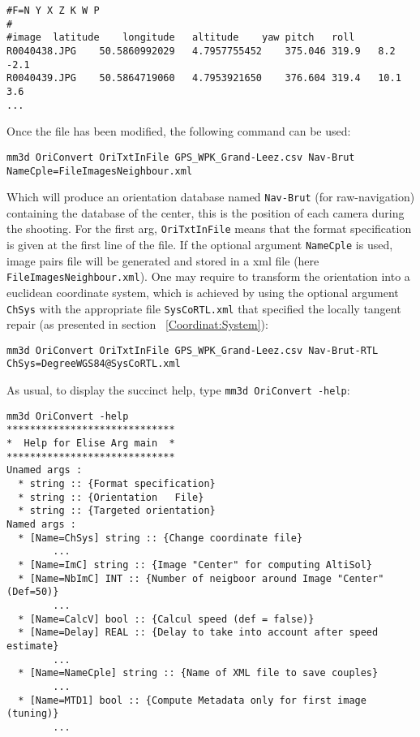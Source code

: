 \begin{verbatim}
#F=N Y X Z K W P
#
#image	latitude	longitude	altitude	yaw	pitch	roll
R0040438.JPG	50.5860992029	4.7957755452	375.046	319.9	8.2	-2.1
R0040439.JPG	50.5864719060	4.7953921650	376.604	319.4	10.1	3.6
...
\end{verbatim}

Once the file has been modified, the following command can be used:

\begin{verbatim}
mm3d OriConvert OriTxtInFile GPS_WPK_Grand-Leez.csv Nav-Brut NameCple=FileImagesNeighbour.xml
\end{verbatim}

Which will produce an orientation database named {\tt Nav-Brut} (for raw-navigation) containing the database of the center, this is the position of each camera during the shooting. For the first arg, {\tt OriTxtInFile} means that the format specification is given at the first line of the file. If the optional argument {\tt NameCple} is used, image pairs file will be generated and stored in a xml file (here {\tt FileImagesNeighbour.xml}).
One may require to transform the orientation into a euclidean coordinate system, which is achieved by using the optional argument {\tt ChSys} with the appropriate file {\tt SysCoRTL.xml} that specified the locally tangent repair (as presented in section ~\ref{Coordinat:System}):

\begin{verbatim}
mm3d OriConvert OriTxtInFile GPS_WPK_Grand-Leez.csv Nav-Brut-RTL ChSys=DegreeWGS84@SysCoRTL.xml
\end{verbatim}

As usual, to display the succinct help, type {\tt mm3d OriConvert -help}:

\begin{verbatim}
mm3d OriConvert -help
*****************************
*  Help for Elise Arg main  *
*****************************
Unamed args :
  * string :: {Format specification}
  * string :: {Orientation   File}
  * string :: {Targeted orientation}
Named args :
  * [Name=ChSys] string :: {Change coordinate file}
        ...
  * [Name=ImC] string :: {Image "Center" for computing AltiSol}
  * [Name=NbImC] INT :: {Number of neigboor around Image "Center" (Def=50)}
        ...
  * [Name=CalcV] bool :: {Calcul speed (def = false)}
  * [Name=Delay] REAL :: {Delay to take into account after speed estimate}
        ...
  * [Name=NameCple] string :: {Name of XML file to save couples}
        ...
  * [Name=MTD1] bool :: {Compute Metadata only for first image (tuning)}
        ...
\end{verbatim}

